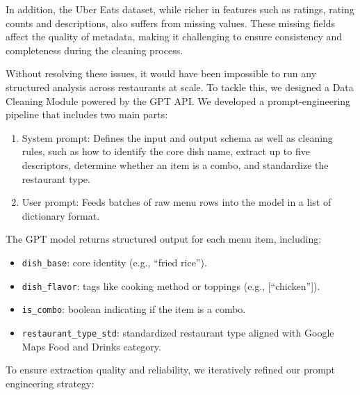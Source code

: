 \documentclass[
  11pt,
  a4paper,
  DIV=11,
  numbers=noendperiod]{scrartcl}
\providecommand{\tightlist}{%
  \setlength{\itemsep}{0pt}\setlength{\parskip}{0pt}}\usepackage{longtable,booktabs,array}
\begin{document}
In addition, the Uber Eats dataset, while richer in features such as
ratings, rating counts and descriptions, also suffers from missing
values. These missing fields affect the quality of metadata, making it
challenging to ensure consistency and completeness during the cleaning
process.

Without resolving these issues, it would have been impossible to run any
structured analysis across restaurants at scale. To tackle this, we
designed a Data Cleaning Module powered by the GPT API. We developed a
prompt-engineering pipeline that includes two main parts:

\begin{enumerate}
\def\labelenumi{\arabic{enumi}.}
\tightlist
\item
  System prompt: Defines the input and output schema as well as cleaning
  rules, such as how to identify the core dish name, extract up to five
  descriptors, determine whether an item is a combo, and standardize the
  restaurant type.
\item
  User prompt: Feeds batches of raw menu rows into the model in a list
  of dictionary format.
\end{enumerate}

The GPT model returns structured output for each menu item, including:

\begin{itemize}
\tightlist
\item
  \texttt{dish\_base}: core identity (e.g., ``fried rice'').
\item
  \texttt{dish\_flavor}: tags like cooking method or toppings (e.g.,
  {[}``chicken''{]}).
\item
  \texttt{is\_combo}: boolean indicating if the item is a combo.
\item
  \texttt{restaurant\_type\_std}: standardized restaurant type aligned
  with Google Maps Food and Drinks category.
\end{itemize}

To ensure extraction quality and reliability, we iteratively refined our
prompt engineering strategy:
\end{document}
